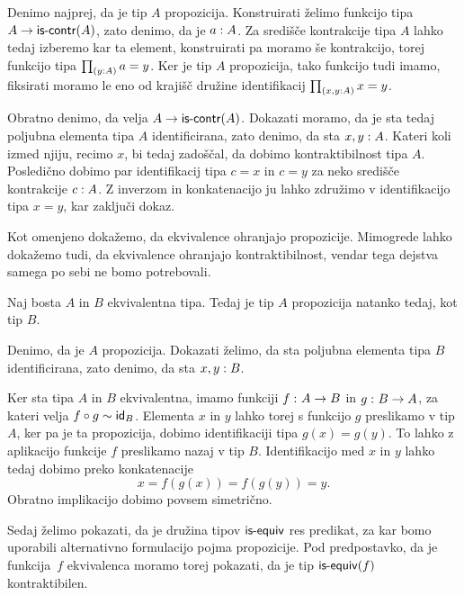 \begin{dokaz}
  Denimo najprej, da je tip \(A\) propozicija. Konstruirati želimo funkcijo tipa \(A \to \textnormal{\textsf{is-contr}}(A)\), zato denimo, da je \({a : A}\). Za središče kontrakcije tipa \(A\) lahko tedaj izberemo kar ta element, konstruirati pa moramo še kontrakcijo, torej funkcijo tipa \(\textstyle \prod_{\left( {y : A} \right)} a = y\). Ker je tip \(A\) propozicija, tako funkcijo tudi imamo, fiksirati moramo le eno od krajišč družine identifikacij \(\textstyle \prod_{\left( {x, y : A} \right)} x = y\).

  Obratno denimo, da velja \(A \to \textnormal{\textsf{is-contr}}(A)\). Dokazati moramo, da je sta tedaj poljubna elementa tipa \(A\) identificirana, zato denimo, da sta \({x, y : A}\). Kateri koli izmed njiju, recimo \(x\), bi tedaj zadoščal, da dobimo kontraktibilnost tipa \(A\). Posledično dobimo par identifikacij tipa \(c = x\) in \(c = y\) za neko središče kontrakcije \({c : A}\). Z inverzom in konkatenacijo ju lahko združimo v identifikacijo tipa \(x = y\), kar zaključi dokaz.
\end{dokaz}

Kot omenjeno dokažemo, da ekvivalence ohranjajo propozicije. Mimogrede lahko dokažemo tudi, da ekvivalence ohranjajo kontraktibilnost, vendar tega dejstva samega po sebi ne bomo potrebovali.

\begin{trditev}
  \label{equiv-preserves-prop}
  Naj bosta \(A\) in \(B\) ekvivalentna tipa. Tedaj je tip \(A\) propozicija natanko tedaj, kot tip \(B\).
\end{trditev}

\begin{dokaz}
  Denimo, da je \(A\) propozicija. Dokazati želimo, da sta poljubna elementa tipa \(B\) identificirana, zato denimo, da sta \({x, y : B}\).

  Ker sta tipa \(A\) in \(B\) ekvivalentna, imamo funkciji \(f \,\colon A \to B\) in
  \(g \,\colon B \to A\), za kateri velja \(f \circ g \sim \textnormal{\textsf{id}}_{B}\). Elementa \(x\) in \(y\) lahko torej s funkcijo \(g\) preslikamo v tip \(A\), ker pa je ta propozicija, dobimo identifikaciji tipa \(g(x) = g(y)\). To lahko z aplikacijo funkcije \(f\) preslikamo nazaj v tip \(B\). Identifikacijo med \(x\) in \(y\) lahko tedaj dobimo preko konkatenacije
  \[x = f(g(x)) = f(g(y)) = y.\]
  Obratno implikacijo dobimo povsem simetrično.
\end{dokaz}

Sedaj želimo pokazati, da je družina tipov \(\textnormal{\textsf{is-equiv}}\) res predikat, za kar bomo uporabili alternativno formulacijo pojma propozicije. Pod predpostavko, da je funkcija~\(f\) ekvivalenca moramo torej pokazati, da je tip \(\textnormal{\textsf{is-equiv}}(f)\) kontraktibilen.


